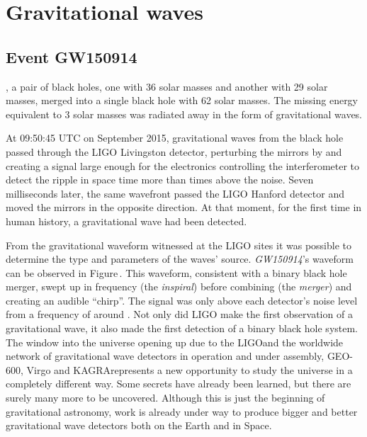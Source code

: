 \chapter{\label{c:gw-detection}Gravitational waves}

\section{Event GW150914}
, a pair of black holes, one with 36 solar masses and another with 29 solar masses, merged into a single black hole with 62 solar masses. The missing energy equivalent to 3 solar masses was radiated away in the form of gravitational waves.

At 09:50:45 \gls{UTC} on  September 2015, gravitational waves from the black hole passed through the LIGO Livingston detector, perturbing the mirrors by  and creating a signal large enough for the electronics controlling the interferometer to detect the ripple in space time more than  times above the noise. Seven milliseconds later, the same wavefront passed the LIGO Hanford detector and moved the mirrors in the opposite direction. At that moment, for the first time in human history, a gravitational wave had been detected.

From the gravitational waveform witnessed at the LIGO sites it was possible to determine the type and parameters of the waves' source. \emph{GW150914}'s waveform can be observed in Figure\,. This waveform, consistent with a binary black hole merger, swept up in frequency (the \emph{inspiral}) before combining (the \emph{merger}) and creating an audible ``chirp''. The signal was only above each detector's noise level from a frequency of around . Not only did LIGO make the first observation of a gravitational wave, it also made the first detection of a binary black hole system. The window into the universe opening up due to the LIGO\textemdash and the worldwide network of gravitational wave detectors in operation and under assembly, GEO-600, Virgo and KAGRA\textemdash represents a new opportunity to study the universe in a completely different way. Some secrets have already been learned, but there are surely many more to be uncovered. Although this is just the beginning of gravitational astronomy, work is already under way to produce bigger and better gravitational wave detectors both on the Earth and in Space.

